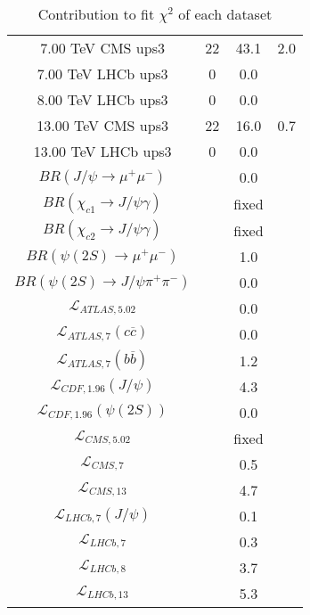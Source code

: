 \begin{table}[h!]
\begin{tabular}{c|c|c|c}
7.00 TeV CMS ups3 & 22 & 43.1 & 2.0 \\
7.00 TeV LHCb ups3 & 0 & 0.0 &  \\
8.00 TeV LHCb ups3 & 0 & 0.0 &  \\
13.00 TeV CMS ups3 & 22 & 16.0 & 0.7 \\
13.00 TeV LHCb ups3 & 0 & 0.0 &  \\
\hline
$BR(J/\psi\rightarrow\mu^+\mu^-)$ &  & 0.0 &  \\
$BR(\chi_{c1}\rightarrow J/\psi\gamma)$ &  & fixed & \\
$BR(\chi_{c2}\rightarrow J/\psi\gamma)$ &  & fixed & \\
$BR(\psi(2S)\rightarrow\mu^+\mu^-)$ &  & 1.0 &  \\
$BR(\psi(2S)\rightarrow J/\psi\pi^+\pi^-)$ &  & 0.0 &  \\
$\mathcal L_{ATLAS,5.02}$ &  & 0.0 &  \\
$\mathcal L_{ATLAS,7}(c\overline c)$ &  & 0.0 &  \\
$\mathcal L_{ATLAS,7}(b\overline b)$ &  & 1.2 &  \\
$\mathcal L_{CDF,1.96}(J/\psi)$ &  & 4.3 &  \\
$\mathcal L_{CDF,1.96}(\psi(2S))$ &  & 0.0 &  \\
$\mathcal L_{CMS,5.02}$ &  & fixed & \\
$\mathcal L_{CMS,7}$ &  & 0.5 &  \\
$\mathcal L_{CMS,13}$ &  & 4.7 &  \\
$\mathcal L_{LHCb,7}(J/\psi)$ &  & 0.1 &  \\
$\mathcal L_{LHCb,7}$ &  & 0.3 &  \\
$\mathcal L_{LHCb,8}$ &  & 3.7 &  \\
$\mathcal L_{LHCb,13}$ &  & 5.3 &  \\
\end{tabular}
\caption{Contribution to fit $\chi^2$ of each dataset}
\end{table}
